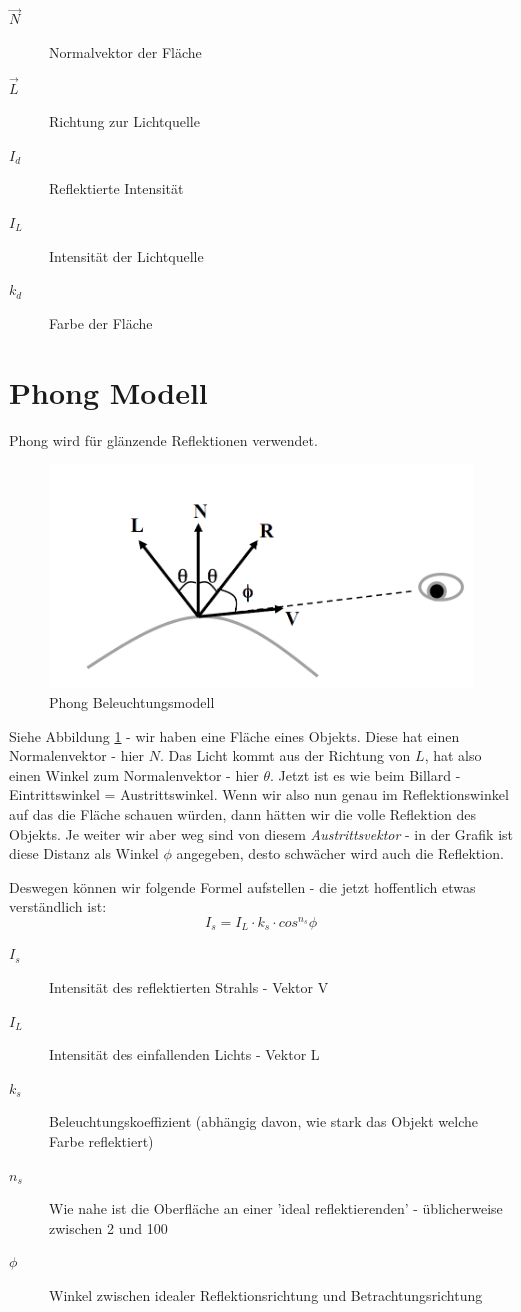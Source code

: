 \begin{description}
	\item[\(\vec{N}\)] Normalvektor der Fläche
	\item[\(\vec{L}\)] Richtung zur Lichtquelle
	\item[\(I_d\)] Reflektierte Intensität
	\item[\(I_L\)] Intensität der Lichtquelle
	\item[\(k_d\)] Farbe der Fläche
\end{description}

\section{Phong Modell}
Phong wird für glänzende Reflektionen verwendet. 
\begin{figure}[!ht]
	\centering
	\includegraphics[width=0.4\linewidth]{fig/phong}
	\caption{Phong Beleuchtungsmodell}
	\label{fig:phong}
\end{figure}
Siehe Abbildung \ref{fig:phong} - wir haben eine Fläche eines Objekts. Diese hat einen Normalenvektor - hier \(N\). Das Licht kommt aus der Richtung von \(L\), hat also einen Winkel zum Normalenvektor - hier \(\theta\). Jetzt ist es wie beim Billard - Eintrittswinkel = Austrittswinkel. Wenn wir also nun genau im Reflektionswinkel auf das die Fläche schauen würden, dann hätten wir die volle Reflektion des Objekts. Je weiter wir aber weg sind von diesem \textit{Austrittsvektor} - in der Grafik ist diese Distanz als Winkel \(\phi\) angegeben, desto schwächer wird auch die Reflektion. 

Deswegen können wir folgende Formel aufstellen - die jetzt hoffentlich etwas verständlich ist:
\begin{displaymath}
I_s = I_L\cdot k_s\cdot cos^{n_s}\phi
\end{displaymath}

\begin{description}
	\item[\(I_s\)] Intensität des reflektierten Strahls - Vektor V
	\item[\(I_L\)] Intensität des einfallenden Lichts - Vektor L
	\item[\(k_s\)] Beleuchtungskoeffizient (abhängig davon, wie stark das Objekt welche Farbe reflektiert)
	\item[\(n_s\)] Wie nahe ist die Oberfläche an einer 'ideal reflektierenden' - üblicherweise zwischen 2 und 100
	\item[\(\phi\)] Winkel zwischen idealer Reflektionsrichtung und Betrachtungsrichtung
\end{description}

